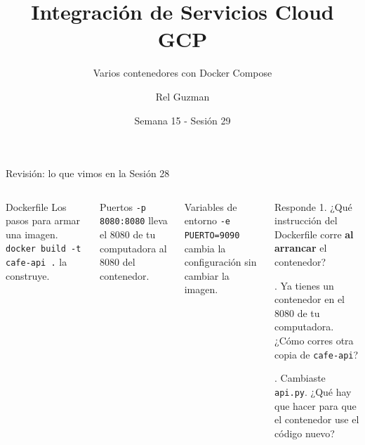 \documentclass[aspectratio=169,10pt,c]{beamer}
\title{Integración de Servicios Cloud GCP}
\subtitle{Varios contenedores con Docker Compose}
\date{Semana 15 - Sesión 29}
\author{Rel Guzman}
\begin{document}
{\maketitle}

\begin{frame}{Revisión: lo que vimos en la Sesión 28}
\begin{columns}[T,onlytextwidth]
\begin{block}{Dockerfile}
\small Los pasos para armar una imagen. \texttt{docker build -t cafe-api .} la construye.
\end{block}
\begin{block}{Puertos}
\small \texttt{-p 8080:8080} lleva el 8080 de tu computadora al 8080 del contenedor.
\end{block}
\begin{block}{Variables de entorno}
\small \texttt{-e PUERTO=9090} cambia la configuración sin cambiar la imagen.
\end{block}
\begin{alertblock}{Responde}
\small
1. ¿Qué instrucción del Dockerfile corre \textbf{al arrancar} el contenedor?\par{}. Ya tienes un contenedor en el 8080 de tu computadora. ¿Cómo corres otra copia de \texttt{cafe-api}?\par{}. Cambiaste \texttt{api.py}. ¿Qué hay que hacer para que el contenedor use el código nuevo?
\end{alertblock}
\end{columns}
\end{frame}
\end{document}
